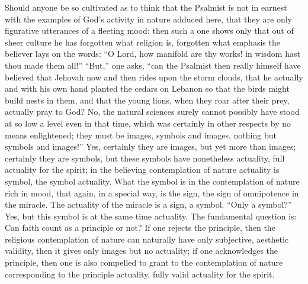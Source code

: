\documentclass[12pt]{book}
\newcommand{\opage}[1]{\marginnote{\footnotesize\textit{[#1]}}}
\begin{document}
Should anyone be so cultivated as to think that the Psalmist is not in
earnest with the examples of God's activity in nature adduced here, that
they are only figurative utterances of a fleeting mood: then such a one
shows only that out of sheer culture he has forgotten what religion is,
forgotten what emphasis the believer lays on the words: ``O Lord, how
manifold are thy works! in wisdom hast thou made them all!'' ``But,''
one asks, ``can the Psalmist then really himself have believed that
Jehovah now and then rides upon the storm clouds, that he actually and
with his own hand planted the cedars on Lebanon so that the birds might
build nests in them, and that the young lions, when they roar after
their prey, actually pray to God? No, the natural sciences surely cannot
possibly have stood at so low a level even in that time, which was
certainly in other respects by no means enlightened; they must be
images, symbols and images, nothing but symbols and images!'' Yes,
certainly they are images, but yet more than images; certainly they are
symbols, but these symbols have nonetheless actuality, full actuality
for the spirit; in the believing contemplation of nature actuality is
symbol, the symbol actuality. What the symbol is in the contemplation
of nature rich in mood, that again, in a special way, is the sign, the
sign of omnipotence in the miracle. The actuality of the miracle is a
sign, a symbol. ``Only a symbol?'' Yes, but this symbol is at the same
time actuality. The fundamental question is: Can faith count as a
principle or not? If one rejects the principle, then the religious
contemplation of nature can naturally have only subjective, aesthetic
validity, then it gives only images but no actuality; if one
acknowledges the principle, then one is also compelled to grant to the
contemplation of nature corresponding to the
\opage{170}\setcounter{footnote}{0}%
principle actuality, fully valid actuality for the spirit.
\end{document}
